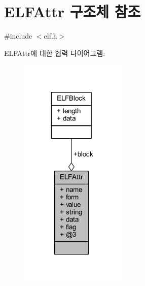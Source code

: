 \hypertarget{struct_e_l_f_attr}{}\section{E\+L\+F\+Attr 구조체 참조}
\label{struct_e_l_f_attr}


{\ttfamily \#include $<$elf.\+h$>$}



E\+L\+F\+Attr에 대한 협력 다이어그램\+:\nopagebreak
\begin{figure}[H]
\begin{center}
\leavevmode
\includegraphics[width=143pt]{struct_e_l_f_attr__coll__graph}
\end{center}
\end{figure}
